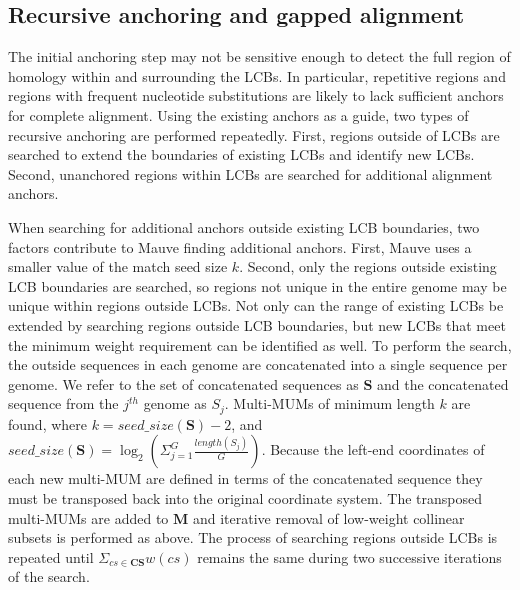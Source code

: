 \documentclass[titlepage,11pt]{article}
\begin{document}
\subsection*{Recursive anchoring and gapped alignment}
The initial anchoring step may not be sensitive enough to detect the full
region of homology within and surrounding the LCBs.  
In particular, repetitive regions and regions with frequent nucleotide
substitutions are likely to lack sufficient anchors for complete alignment.
Using the existing anchors as a guide, two types of recursive anchoring are
performed repeatedly.  First, regions outside of LCBs are searched to extend the
boundaries of existing LCBs and identify new LCBs.  Second, unanchored regions
within LCBs are searched for additional alignment anchors.

When searching for additional anchors outside existing LCB boundaries, two
factors contribute to Mauve finding additional anchors.  First, Mauve uses a
smaller value of the match seed size $k$.  Second, only the regions outside
existing LCB boundaries are searched, so regions not unique in the
entire genome may be unique within regions outside LCBs.
Not only can the range of existing LCBs be extended by searching regions outside
LCB boundaries, but new LCBs that meet the minimum weight requirement can
be identified as well.  
To perform the search, the
outside sequences in each genome are concatenated into a single sequence per
genome.  We refer to the set of concatenated sequences as $\mathbf{S}$ and the
concatenated sequence from the $j^{th}$ genome as $S_j$.  Multi-MUMs of minimum length $k$ are found, where $k =
seed\_size(\mathbf{S}) - 2$, and 
$seed\_size(\mathbf{S}) = \log_2{(\Sigma_{j=1}^{G}{\frac{length(S_j)}{G}})}$. 
Because the left-end coordinates of each new
multi-MUM are defined in terms of the concatenated sequence they must be
transposed back into the original coordinate system.  The transposed
multi-MUMs are added to $\mathbf{M}$
and iterative removal of low-weight collinear subsets is performed as above.
The process of searching regions outside LCBs is repeated until $\Sigma_{cs \in
\mathbf{CS}}{w(cs)}$ remains the same during two successive iterations of the search.


\end{document}
